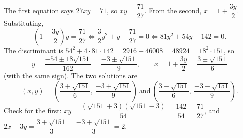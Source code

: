 The first equation says $27xy=71$, so $xy=\dfrac{71}{27}$. From the second, $x=1+\dfrac{3y}{2}$. Substituting,
\[
\left(1+\dfrac{3y}{2}\right)y=\dfrac{71}{27}\iff\dfrac{3}{2}y^2+y-\dfrac{71}{27}=0\iff81y^2+54y-142=0 .
\]
The discriminant is $54^2+4\cdot81\cdot142=2916+46008=48924=18^2\cdot151$, so
\[
y=\dfrac{-54\pm18\sqrt{151}}{162}=\dfrac{-3\pm\sqrt{151}}{9},\qquad x=1+\dfrac{3y}{2}=\dfrac{3\pm\sqrt{151}}{6}
\]
(with the same sign). The two solutions are
\[
\boxed{(x,y)=\left(\dfrac{3+\sqrt{151}}{6},\ \dfrac{-3+\sqrt{151}}{9}\right)\ \text{and}\ \left(\dfrac{3-\sqrt{151}}{6},\ \dfrac{-3-\sqrt{151}}{9}\right)}.
\]
Check for the first: $xy=\dfrac{(\sqrt{151}+3)(\sqrt{151}-3)}{54}=\dfrac{142}{54}=\dfrac{71}{27}$, and $2x-3y=\dfrac{3+\sqrt{151}}{3}-\dfrac{-3+\sqrt{151}}{3}=2$.
